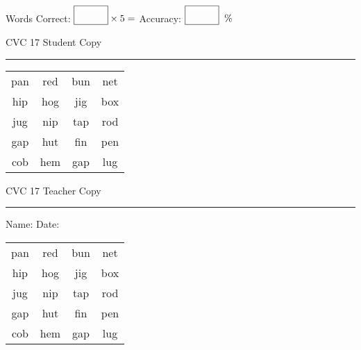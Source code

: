 \documentclass{memoir}
\begin{document}
\normalsize

Words Correct: $\fbox{\phantom{\huge 100}} \times 5 = $ Accuracy: $\fbox{\phantom{\huge 100}}\;\; \%$ 

\vfill

\newpage


\footnotesize \noindent
CVC 17 \hfill Student Copy
\smallskip
\hrule

\huge

\setlength{\tabcolsep}{14pt}
\def\arraystretch{2}

{\selectfont


\begin{vplace}[0.5]
\begin{center}
\begin{tabular}{cccc}
pan & red & bun & net \\
hip & hog & jig & box \\
jug & nip & tap & rod \\
gap & hut & fin & pen \\
cob & hem & gap & lug \\
\end{tabular}
\end{center}
\end{vplace}

}

\newpage

\footnotesize \noindent
CVC 17 \hfill Teacher Copy
\smallskip
\hrule

\normalsize

\vfill

\noindent
Name: \underline{\hspace{1.75in}} \hfill Date: \underline{\hspace{1in}}

\huge

{\selectfont


\begin{vplace}[0.5]
\begin{center}
\begin{tabular}{cccc}
pan & red & bun & net \\
hip & hog & jig & box \\
jug & nip & tap & rod \\
gap & hut & fin & pen \\
cob & hem & gap & lug \\
\end{tabular}
\end{center}
\end{vplace}



}
\end{document}
